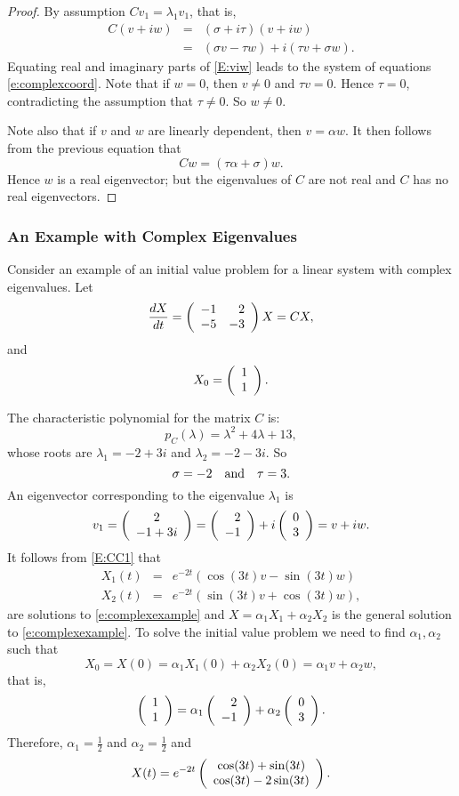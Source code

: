 \documentclass{ximera}
\begin{document}
\begin{proof}   By assumption $Cv_1=\lambda_1v_1$, that is,
\begin{equation}  \label{E:viw}
\begin{array}{rcl}
C (v+iw) & = & (\sigma+i\tau)(v+iw) \\
& = & (\sigma v - \tau w) + i(\tau v + \sigma w).
\end{array}
\end{equation}
Equating real and imaginary parts of \eqref{E:viw} leads to the system of
equations \eqref{e:complexcoord}.  Note that if $w=0$, then $v\neq 0$ and
$\tau v = 0$.  Hence $\tau=0$, contradicting the assumption that
$\tau\neq 0$.  So $w\neq 0$.

Note also that if $v$ and $w$ are linearly dependent, then $v=\alpha w$.
It then follows from the previous equation that
\[
Cw = (\tau\alpha+\sigma)w.
\]
Hence $w$ is a real eigenvector; but the eigenvalues of $C$ are not real and
$C$ has no real eigenvectors.   \end{proof}


\subsubsection*{An Example with Complex Eigenvalues}

Consider an example of an initial value problem for a linear system with
complex eigenvalues.  Let
\begin{equation}  \label{e:complexexample}
\frac{dX}{dt} = \left(\begin{array}{rr} -1 & 2\\ -5 &-3\end{array}\right) X = CX,
\end{equation}
and
\[
X_0=\left(\begin{array}{r} 1 \\ 1\end{array}\right).
\]

The characteristic polynomial for the
matrix $C$ is:
\[
p_C(\lambda) = \lambda^2 +4\lambda + 13,
\]
whose roots are $\lambda_1 = -2+3i$ and $\lambda_2 = -2-3i$. So
\[
\sigma = -2 \quad\mbox{and}\quad \tau = 3.
\]
An eigenvector corresponding to the eigenvalue $\lambda_1$ is
\[
v_1 = \left(\begin{array}{c} 2 \\ -1+3i\end{array}\right) = \left(\begin{array}{r} 2 \\ -1\end{array}\right)+i\left(\begin{array}{r} 0 \\ 3\end{array}\right)=v+iw.
\]
It follows from \eqref{E:CC1} that
\[
\begin{array}{rcl}
X_1(t) & = & e^{-2t}(\cos(3t)v -\sin(3t)w)\\
X_2(t) & = & e^{-2t}(\sin(3t)v +\cos(3t)w),
\end{array}
\]
are solutions to \eqref{e:complexexample} and $X=\alpha_1X_1+\alpha_2X_2$ is
the general solution to \eqref{e:complexexample}.  To solve the initial value
problem we need to find $\alpha_1,\alpha_2$ such that
\[
X_0 = X(0) = \alpha_1X_1(0) + \alpha_2X_2(0) = \alpha_1 v + \alpha_2 w,
\]
that is,
\[
\left(\begin{array}{r} 1 \\ 1\end{array}\right) = \alpha_1\left(\begin{array}{r} 2 \\ -1\end{array}\right)  + \alpha_2\left(\begin{array}{r} 0 \\ 3\end{array}\right).
\]
Therefore, $\alpha_1 = \frac{1}{2}$ and $\alpha_2=\frac{1}{2}$ and
\begin{equation}  \label{e:complexexampleans}
X(t) =  e^{-2t}\left(\begin{array}{c} \cos(3t)+\sin(3t) \\ \cos(3t)-2\sin(3t)\end{array}\right).
\end{equation}
\end{document}
